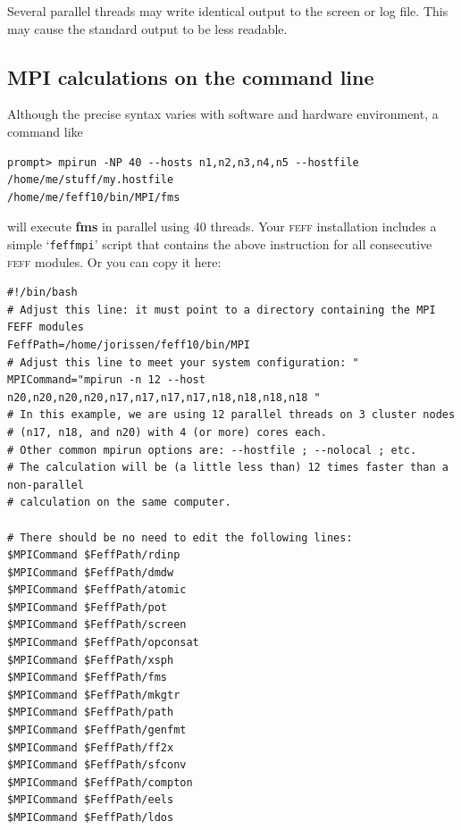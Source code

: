 \documentclass[11pt,oneside]{report} %
\renewcommand{\htmlref}[2]{\hyperlink{#2}{#1}}
\newcommand{\program}[1]{\textsc{#1}}
\newcommand{\feff}{\program{feff}}
\newcommand{\file}[1]{`\texttt{#1}'}
\newcommand{\module}[1]{\textrm{\bf{#1}}}
\renewcommand{\htmlref}[2]{{#1}} %
\begin{document}
Several parallel threads may write identical output to the screen or log file.  This may cause the standard output to be less readable.


\subsection{MPI calculations on the command line}
  
    Although the precise syntax varies with software and hardware environment, a command like
\begin{verbatim}
prompt> mpirun -NP 40 --hosts n1,n2,n3,n4,n5 --hostfile /home/me/stuff/my.hostfile 
/home/me/feff10/bin/MPI/fms
\end{verbatim}
will execute \module{fms} in parallel using 40 threads.  Your {\feff} installation includes a simple \file{feffmpi} script that contains the above instruction for all consecutive {\feff} modules.  Or you can copy it here:

\begin{verbatim}
#!/bin/bash
# Adjust this line: it must point to a directory containing the MPI FEFF modules
FeffPath=/home/jorissen/feff10/bin/MPI
# Adjust this line to meet your system configuration: "
MPICommand="mpirun -n 12 --host n20,n20,n20,n20,n17,n17,n17,n17,n18,n18,n18,n18 "
# In this example, we are using 12 parallel threads on 3 cluster nodes 
# (n17, n18, and n20) with 4 (or more) cores each.
# Other common mpirun options are: --hostfile ; --nolocal ; etc.
# The calculation will be (a little less than) 12 times faster than a non-parallel 
# calculation on the same computer.

# There should be no need to edit the following lines:
$MPICommand $FeffPath/rdinp
$MPICommand $FeffPath/dmdw
$MPICommand $FeffPath/atomic
$MPICommand $FeffPath/pot
$MPICommand $FeffPath/screen
$MPICommand $FeffPath/opconsat
$MPICommand $FeffPath/xsph
$MPICommand $FeffPath/fms
$MPICommand $FeffPath/mkgtr
$MPICommand $FeffPath/path
$MPICommand $FeffPath/genfmt
$MPICommand $FeffPath/ff2x
$MPICommand $FeffPath/sfconv
$MPICommand $FeffPath/compton
$MPICommand $FeffPath/eels
$MPICommand $FeffPath/ldos
\end{verbatim}
\end{document}
